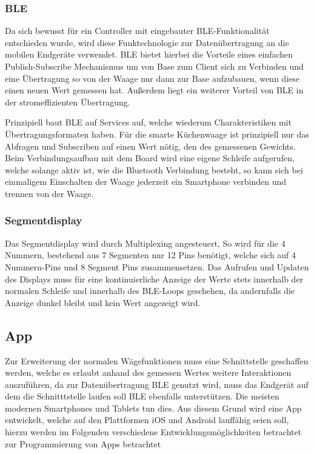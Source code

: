 \subsubsection{BLE\label{Kap.:BLE}}

Da sich bewusst für ein Controller mit eingebauter \ac{BLE}-Funktionalität entschieden wurde, wird diese Funktechnologie zur Datenübertragung an die mobilen Endgeräte verwendet. \ac{BLE} bietet hierbei die Vorteile eines einfachen Publish-Subscribe Mechanismus um von Base zum Client sich zu Verbinden und eine Übertragung so von der Waage nur dann zur Base aufzubauen, wenn diese einen neuen Wert gemessen hat. Außerdem liegt ein weiterer Vorteil von \ac{BLE} in der stromeffizienten Übertragung.

Prinzipiell baut \ac{BLE} auf Services auf, welche wiederum Charakteristiken mit Übertragungsformaten haben. Für die smarte Küchenwaage ist prinzipiell nur das Abfragen und Subscriben auf einen Wert nötig, den des gemessenen Gewichts. Beim Verbindungsaufbau mit dem Board wird eine eigene Schleife aufgerufen, welche solange aktiv ist, wie die Bluetooth Verbindung besteht, so kann sich bei einmaligem Einschalten der Waage jederzeit ein Smartphone verbinden und trennen von der Waage. 

\subsubsection{Segmentdisplay}
Das Segmentdisplay wird durch Multiplexing angesteuert,  So wird für die 4 Nummern, bestehend aus 7 Segmenten nur 12 Pins benötigt, welche sich auf 4 Nummern-Pins und 8 Segment Pins zusammensetzen. 
Das Aufrufen und Updaten des Displays muss für eine kontinuierliche Anzeige der Werte stets innerhalb der normalen Schleife und innerhalb des \ac{BLE}-Loops geschehen, da andernfalls die Anzeige dunkel bleibt und kein Wert angezeigt wird. 

\subsection{App}

Zur Erweiterung der normalen Wägefunktionen muss eine Schnittstelle geschaffen werden, welche es erlaubt anhand des gemessen Wertes weitere Interaktionen auszuführen, da zur Datenübertragung BLE genutzt wird, muss das Endgerät auf dem die Schnitttstelle laufen soll \ac{BLE} ebenfalls unterstützen. Die meisten modernen Smartphones und Tablets tun dies. 
Aus diesem Grund wird eine App entwickelt, welche auf den Plattformen iOS und Android lauffähig seien soll, hierzu werden im Folgenden verschiedene Entwicklungsmöglichkeiten betrachtet zur Programmierung von Apps betrachtet 
